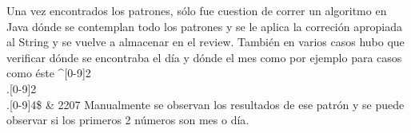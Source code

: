 Una vez encontrados los patrones, sólo fue cuestion de correr un algoritmo en Java dónde se contemplan todo los patrones y se 
le aplica la correción apropiada al String y se vuelve a almacenar en el review.
También en varios casos hubo que verificar dónde se encontraba el día y dónde el mes como por ejemplo para casos como éste ^[0-9]{2}\\.[0-9]{2}\\.[0-9]{4}\$ & 2207 
Manualmente se observan los resultados de ese patrón y se puede observar si los primeros 2 números son mes o día.

